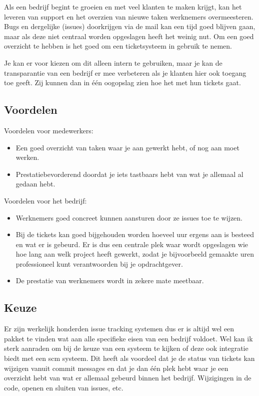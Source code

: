Als een bedrijf begint te groeien en met veel klanten te maken krijgt, kan het leveren van support en het overzien van nieuwe taken werknemers overmeesteren. Bugs en dergelijke (issues) doorkrijgen via de mail kan een tijd goed blijven gaan, maar als deze niet centraal worden opgeslagen heeft het weinig nut. Om een goed overzicht te hebben is het goed om een ticketsysteem in gebruik te nemen.

Je kan er voor kiezen om dit alleen intern te gebruiken, maar je kan de transparantie van een bedrijf er mee verbeteren als je klanten hier ook toegang toe geeft. Zij kunnen dan in \'{e}\'{e}n oogopslag zien hoe het met hun tickets gaat.

\subsection{Voordelen}

Voordelen voor medewerkers:

\begin{itemize}
  \item Een goed overzicht van taken waar je aan gewerkt hebt, of nog aan moet werken.
  \item Prestatiebevorderend doordat je iets tastbaars hebt van wat je allemaal al gedaan hebt.
\end{itemize}

Voordelen voor het bedrijf:

\begin{itemize}
  \item Werknemers goed concreet kunnen aansturen door ze issues toe te wijzen.
  \item Bij de tickets kan goed bijgehouden worden hoeveel uur ergens aan is besteed en wat er is gebeurd. Er is dus een centrale plek waar wordt opgeslagen wie hoe lang aan welk project heeft gewerkt, zodat je bijvoorbeeld gemaakte uren professioneel kunt verantwoorden bij je opdrachtgever.
  \item De prestatie van werknemers wordt in zekere mate meetbaar.
\end{itemize}

\subsection{Keuze}

Er zijn werkelijk honderden issue tracking systemen\cite{issuetracking} dus er is altijd wel een pakket te vinden wat aan alle specifieke eisen van een bedrijf voldoet. Wel kan ik sterk aanraden om bij de keuze van een systeem te kijken of deze ook integratie biedt met een {\sc scm} systeem. Dit heeft als voordeel dat je de status van tickets kan wijzigen vanuit commit messages en dat je dan \'{e}\'{e}n plek hebt waar je een overzicht hebt van wat er allemaal gebeurd binnen het bedrijf. Wijzigingen in de code, openen en sluiten van issues, etc.

